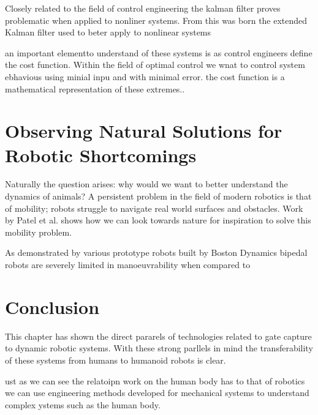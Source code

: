 Closely related to the field of control engineering the kalman filter proves problematic when applied to nonliner systems. From this was born the extended Kalman filter used to beter apply to nonlinear systems

an important elementto understand of these systems is as control engineers define the cost function. Within the field of optimal control we wnat to control system ebhavious using minial inpu and with minimal error. the cost function is a mathematical representation of these extremes.. 

















\section{Observing Natural Solutions for Robotic Shortcomings}
Naturally the question arises:  why would we want to better understand the dynamics of animals? A persistent problem in the field of modern robotics is that of mobility; robots struggle to navigate real world surfaces and obstacles. Work by Patel et al. \cite{patel2013rapid} shows how we can look towards nature for inspiration to solve this mobility problem. 

As demonstrated by various prototype robots built by Boston Dynamics bipedal robots are severely limited in manoeuvrability when compared to   















\section{Conclusion}
This chapter has shown the direct pararels of technologies related to gate capture to dynamic robotic systems. With these strong parllels in mind the transferability of these systems from humans to humanoid robots is clear.

ust as we can see the relatoipn work on the human body has to that of robotics we can use engineering methods developed for mechanical systems to understand complex ystems such as the human body.



































